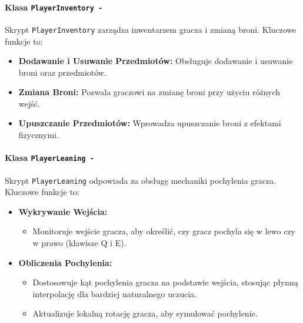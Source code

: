 \paragraph{Klasa \texttt{PlayerInventory -}}
Skrypt \texttt{PlayerInventory} zarządza inwentarzem gracza i zmianą broni. Kluczowe funkcje to:
\begin{itemize}
  \item \textbf{Dodawanie i Usuwanie Przedmiotów:} Obsługuje dodawanie i usuwanie broni oraz przedmiotów.
  \item \textbf{Zmiana Broni:} Pozwala graczowi na zmianę broni przy użyciu różnych wejść.
  \item \textbf{Upuszczanie Przedmiotów:} Wprowadza upuszczanie broni z efektami fizycznymi.
\end{itemize}

\paragraph{Klasa \texttt{PlayerLeaning -}}
Skrypt \texttt{PlayerLeaning} odpowiada za obsługę mechaniki pochylenia gracza. Kluczowe funkcje to:
\begin{itemize}
  \item \textbf{Wykrywanie Wejścia:}
    \begin{itemize}
      \item Monitoruje wejście gracza, aby określić, czy gracz pochyla się w lewo czy w prawo (klawisze Q i E).
    \end{itemize}
  \item \textbf{Obliczenia Pochylenia:}
    \begin{itemize}
      \item Dostosowuje kąt pochylenia gracza na podstawie wejścia, stosując płynną interpolację dla bardziej naturalnego uczucia.
      \item Aktualizuje lokalną rotację gracza, aby symulować pochylenie.
    \end{itemize}
\end{itemize}


